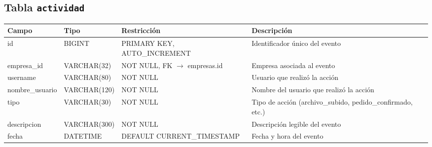\subsection*{Tabla \texttt{actividad}}
\begin{table}[H]
\centering
\renewcommand{\arraystretch}{1.3}
\begin{tabularx}{\textwidth}{|>{\raggedright\arraybackslash}p{3.0cm}|l|>{\raggedright\arraybackslash}p{3.2cm}|X|}
\hline
\textbf{Campo} & \textbf{Tipo} & \textbf{Restricción} & \textbf{Descripción} \\
\hline
id & BIGINT & PRIMARY KEY, AUTO\_\discretionary{}{}{}INCREMENT & Identificador único del evento \\
\hline
empresa\_\discretionary{}{}{}id & VARCHAR(32) & NOT NULL, FK $\to$ empresas.id & Empresa asociada al evento \\
\hline
username & VARCHAR(80) & NOT NULL & Usuario que realizó la acción \\
\hline
nombre\_\discretionary{}{}{}usuario & VARCHAR(120) & NOT NULL & Nombre del usuario que realizó la acción \\
\hline
tipo & VARCHAR(30) & NOT NULL & Tipo de acción (archivo\_subido, pedido\_confirmado, etc.) \\
\hline
descripcion & VARCHAR(300) & NOT NULL & Descripción legible del evento \\
\hline
fecha & DATETIME & DEFAULT CURRENT\_\discretionary{}{}{}TIMESTAMP & Fecha y hora del evento \\
\hline
\end{tabularx}
\end{table}

